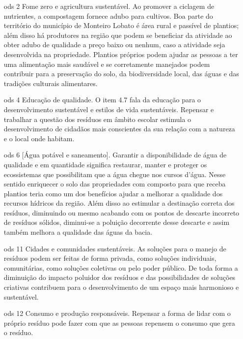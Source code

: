\begin{itemize}
	\item[\gls{ods} 2] Fome zero e agricultura sustentável. Ao promover a ciclagem de nutrientes, a compostagem fornece adubo para cultivos. Boa parte do território do município de Monteiro Lobato é área rural e passível de plantios; além disso há produtores na região que podem se beneficiar da atividade ao obter adubo de qualidade a preço baixo ou nenhum, caso a atividade seja desenvolvida na propriedade. Plantios próprios podem ajudar as pessoas a ter uma alimentação mais saudável e se corretamente manejados podem contribuir para a preservação do solo, da biodiversidade local, das águas e das tradições culturais alimentares.
	\item[\gls{ods} 4] Educação de qualidade. O item 4.7 fala da educação para o desenvolvimento sustentável e estilos de vida sustentáveis. Repensar e trabalhar a questão dos resíduos em âmbito escolar estimula o desenvolvimento de cidadãos mais conscientes da sua relação com a natureza e o local onde habitam.
	\item[\gls{ods} 6] [Água potável e saneamento]. Garantir a disponibilidade de água de qualidade e em quantidade significa restaurar, manter e proteger os ecossistemas que possibilitam que a água chegue nos cursos d'água. Nesse sentido enriquecer o solo das propriedades com composto para que receba plantios teria como um dos benefícios ajudar a melhorar a qualidade dos recursos hídricos da região. Além disso ao estimular a destinação correta dos resíduos, diminuindo ou mesmo acabando com os pontos de descarte incorreto de resíduos sólidos, diminui-se a poluição decorrente desse descarte e assim também melhora a qualidade das águas da bacia. 
	\item[\gls{ods} 11]	Cidades e comunidades sustentáveis. As soluções para o manejo de resíduos podem ser feitas de forma privada, como soluções individuais, comunitárias, como soluções coletivas ou pelo poder público. De toda forma a diminuição do impacto poluidor dos resíduos e das possibilidades de soluções criativas contribuem para o desenvolvimento de um espaço mais harmonioso e sustentável.
	\item[\gls{ods} 12] Consumo e produção responsáveis. %
	Repensar a forma de lidar com o próprio resíduo pode fazer com que as pessoas repensem o consumo que gera o resíduo.  
\end{itemize}

